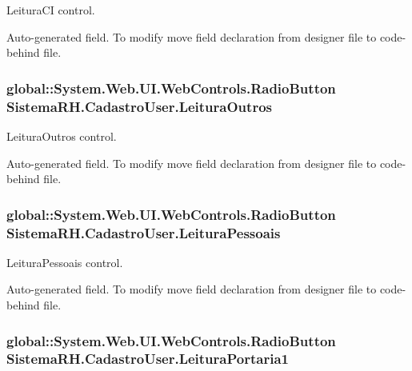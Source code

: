 LeituraCI control. 

Auto-\/generated field. To modify move field declaration from designer file to code-\/behind file. \hypertarget{class_sistema_r_h_1_1_cadastro_user_a222688f378ab406208912699aee5b624}{
\subsubsection[{LeituraOutros}]{\setlength{\rightskip}{0pt plus 5cm}global::System.Web.UI.WebControls.RadioButton {\bf SistemaRH.CadastroUser.LeituraOutros}}}
\label{class_sistema_r_h_1_1_cadastro_user_a222688f378ab406208912699aee5b624}


LeituraOutros control. 

Auto-\/generated field. To modify move field declaration from designer file to code-\/behind file. \hypertarget{class_sistema_r_h_1_1_cadastro_user_aebe687cb1296669e740ba400287861d4}{
\subsubsection[{LeituraPessoais}]{\setlength{\rightskip}{0pt plus 5cm}global::System.Web.UI.WebControls.RadioButton {\bf SistemaRH.CadastroUser.LeituraPessoais}}}
\label{class_sistema_r_h_1_1_cadastro_user_aebe687cb1296669e740ba400287861d4}


LeituraPessoais control. 

Auto-\/generated field. To modify move field declaration from designer file to code-\/behind file. \hypertarget{class_sistema_r_h_1_1_cadastro_user_acbcd6b0df4328d0be4d9b71f8151a4f2}{
\subsubsection[{LeituraPortaria1}]{\setlength{\rightskip}{0pt plus 5cm}global::System.Web.UI.WebControls.RadioButton {\bf SistemaRH.CadastroUser.LeituraPortaria1}}}
\label{class_sistema_r_h_1_1_cadastro_user_acbcd6b0df4328d0be4d9b71f8151a4f2}



